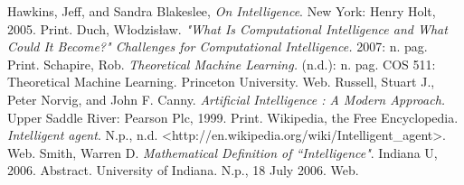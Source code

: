 \documentclass[11pt, oneside]{article}
\begin{document}
\begin{thebibliography}{9}
	Hawkins, Jeff, and Sandra Blakeslee,
	\emph{On Intelligence}.
	New York: Henry Holt, 2005.
	Print.
	Duch, W\l{}odzis\l{}aw.
	\emph{"What Is Computational Intelligence and What Could It Become?" Challenges for Computational Intelligence.}
	2007: n. pag. Print.
	Schapire, Rob. 
	\emph{Theoretical Machine Learning.} 
	(n.d.): n. pag. COS 511: Theoretical Machine Learning. Princeton University. 
	Web.
	Russell, Stuart J., Peter Norvig, and John F. Canny. 
	\emph{Artificial Intelligence : A Modern Approach.}
	Upper Saddle River: Pearson Plc, 1999. Print.
	Wikipedia, the Free Encyclopedia. 
	\emph{Intelligent agent}.
	N.p., n.d. <http://en.wikipedia.org/wiki/Intelligent\_agent>.
	Web.
	Smith, Warren D. 
	\emph{Mathematical Definition of ``Intelligence"}.
	Indiana U, 2006. Abstract. University of Indiana. N.p., 18 July 2006. 
	Web.
\end{thebibliography}
\end{document}
